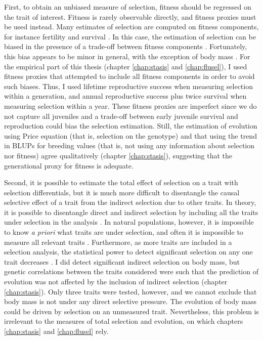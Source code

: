 First, to obtain an unbiased measure of selection, fitness should be regressed on the trait of interest. Fitness is rarely observable directly, and fitness proxies must be used instead. Many estimates of selection are computed on fitness components, for instance fertility and survival \parencite{Kingsolver2012}. In this case, the estimation of selection can be biased in the presence of a trade-off between fitness components \parencite{Thompson2011, Kingsolver2012, Brookfield2016}. Fortunately, this bias appears to be minor in general, with the exception of body mass \parencite{Kingsolver2011}.
For the empirical part of this thesis (chapter \ref{chap:stasis} and \ref{chap:flusel}), I used fitness proxies that attempted to include all fitness components in order to avoid such biases. Thus, I used lifetime reproductive success when measuring selection within a generation, and annual reproductive success plus twice survival when measuring selection within a year. These fitness proxies are imperfect since we do not capture all juveniles and a trade-off between early juvenile survival and reproduction could bias the selection estimation. Still, the estimation of evolution using Price equation (that is, selection on the genotype) and that using the trend in BLUPs for breeding values (that is, not using any information about selection nor fitness) agree qualitatively (chapter \ref{chap:stasis}), suggesting that the generational proxy for fitness is adequate. 

Second, it is possible to estimate the total effect of selection on a trait with selection differentials, but it is much more difficult to disentangle the causal selective effect of a trait from the indirect selection due to other traits. In theory, it is possible to disentangle direct and indirect selection by including all the traits under selection in the analysis \parencite{Lande1983}. In natural populations, however, it is impossible to know \emph{a priori} what traits are under selection, and often it is impossible to measure all relevant traits \parencite{Brookfield2016, Hadfield2008}. Furthermore, as more traits are included in a selection analysis, the statistical power to detect significant selection on any one trait decreases \parencite{Mitchell-Olds1987}.
I did detect significant indirect selection on body mass, but genetic correlations between the traits considered were such that the prediction of evolution was not affected by the inclusion of indirect selection (chapter \ref{chap:stasis}). Only three traits were tested, however, and we cannot exclude that body mass is not under any direct selective pressure. The evolution of body mass could be driven by selection on an unmeasured trait.
Nevertheless, this problem is irrelevant to the measures of total selection and evolution, on which chapters \ref{chap:stasis} and \ref{chap:flusel} rely.

